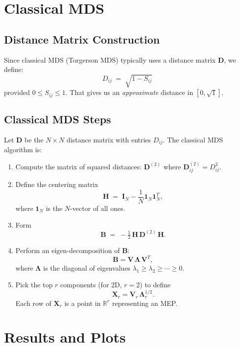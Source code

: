 \documentclass{article}
\begin{document}
\section{Classical MDS}

\subsection{Distance Matrix Construction}

Since classical MDS (Torgerson MDS) typically uses a distance matrix \(\mathbf{D}\), we define:
\[
       D_{ij} \;=\; \sqrt{1 - S_{ij}}
\]
provided \(0 \le S_{ij} \le 1\). That gives us an \emph{approximate} distance in \([0,\sqrt{1}]\). 

\subsection{Classical MDS Steps}

Let \(\mathbf{D}\) be the \(N \times N\) distance matrix with entries \(D_{ij}\). The classical MDS algorithm is:

\begin{enumerate}
    \item Compute the matrix of squared distances: \(\mathbf{D}^{(2)}\) where \(\mathbf{D}^{(2)}_{ij} = D_{ij}^2.\)
    \item Define the centering matrix 
    \[
        \mathbf{H} \;=\; \mathbf{I}_N - \frac{1}{N} \mathbf{1}_N \mathbf{1}_N^T,
    \]
    where \(\mathbf{1}_N\) is the \(N\)-vector of all ones.
    \item Form 
    \[
        \mathbf{B} \;=\; -\tfrac12 \, \mathbf{H} \,\mathbf{D}^{(2)}\, \mathbf{H}.
    \]
    \item Perform an eigen-decomposition of \(\mathbf{B}\):
    \[
        \mathbf{B} = \mathbf{V}\,\mathbf{\Lambda}\,\mathbf{V}^T,
    \]
    where \(\mathbf{\Lambda}\) is the diagonal of eigenvalues \(\lambda_1 \ge \lambda_2 \ge \cdots \ge 0\).
    \item Pick the top \(r\) components (for 2D, \(r=2\)) to define
    \[
        \mathbf{X}_r = \mathbf{V}_r \, \mathbf{\Lambda}_r^{1/2}.
    \]
    Each row of \(\mathbf{X}_r\) is a point in \(\mathbb{R}^r\) representing an MEP.
\end{enumerate}



\section{Results and Plots}
\end{document}
